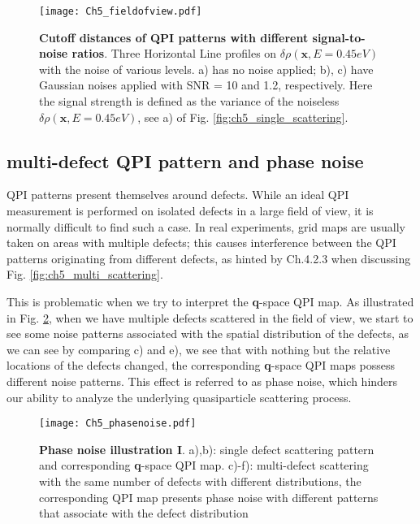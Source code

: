 \begin{figure}
	\texttt{[image: Ch5\_fieldofview.pdf]} 
	\centering
	\caption[\textbf{Cutoff distances of QPI patterns with different signal-to-noise ratios}]{\textbf{Cutoff distances of QPI patterns with different signal-to-noise ratios}. Three Horizontal Line profiles on $\delta\rho(\textbf{x}, E=0.45eV)$ with the noise of various levels. a) has no noise applied; b), c) have Gaussian noises applied with SNR = 10 and 1.2, respectively. Here the signal strength is defined as the variance of the noiseless $\delta\rho(\textbf{x}, E=0.45eV)$, see a) of Fig. \ref{fig:ch5_single_scattering}.}
	\label{fig:ch5_cutoff}
\end{figure}


\subsection{multi-defect QPI pattern and phase noise}
\ac{QPI} patterns present themselves around defects. While an ideal \ac{QPI} measurement is performed on isolated defects in a large field of view, it is normally difficult to find such a case. In real experiments, grid maps are usually taken on areas with multiple defects; this causes interference between the \ac{QPI} patterns originating from different defects, as hinted by Ch.4.2.3 when discussing Fig. \ref{fig:ch5_multi_scattering}.

This is problematic when we try to interpret the \textbf{q}-space \ac{QPI} map. As illustrated in Fig. \ref{fig:ch5_phasenoise}, when we have multiple defects scattered in the field of view, we start to see some noise patterns associated with the spatial distribution of the defects, as we can see by comparing c) and e), we see that with nothing but the relative locations of the defects changed, the corresponding \textbf{q}-space \ac{QPI} maps possess different noise patterns. This effect is referred to as phase noise, which hinders our ability to analyze the underlying quasiparticle scattering process. 

\begin{figure}
	\texttt{[image: Ch5\_phasenoise.pdf]} 
	\centering
	\caption[\textbf{Phase noise illustration I}]{\textbf{Phase noise illustration I}. a),b): single defect scattering pattern and corresponding \textbf{q}-space QPI map. c)-f): multi-defect scattering with the same number of defects with different distributions, the corresponding QPI map presents phase noise with different patterns that associate with the defect distribution}
	\label{fig:ch5_phasenoise}
\end{figure}

